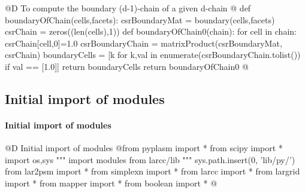 \documentclass[11pt,oneside]{article}	%
\begin{document}
@D To compute the boundary (d-1)-chain of a given d-chain
@{
def boundaryOfChain(cells,facets):
	csrBoundaryMat = boundary(cells,facets)
	csrChain = zeros((len(cells),1))
	def boundaryOfChain0(chain):
		for cell in chain:  csrChain[cell,0]=1.0
		csrBoundaryChain = matrixProduct(csrBoundaryMat, csrChain)
		boundaryCells = [k for k,val in enumerate(csrBoundaryChain.tolist()) 
							if val == [1.0]]
		return boundaryCells
	return boundaryOfChain0
@}


\subsection{Initial import of modules}

\paragraph{Initial import of modules}

@D Initial import of modules
@{from pyplasm import *
from scipy import *
import os,sys
""" import modules from larcc/lib """
sys.path.insert(0, 'lib/py/')
from lar2psm import *
from simplexn import *
from larcc import *
from largrid import *
from mapper import *
from boolean import *
@}



\end{document}
